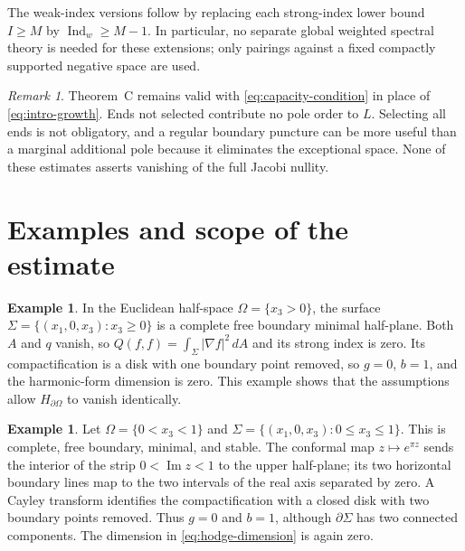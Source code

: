 \documentclass[11pt]{amsart}
\numberwithin{equation}{section}
\theoremstyle{definition}
\newtheorem{example}[theorem]{Example}
\theoremstyle{remark}
\newtheorem{remark}[theorem]{Remark}
\newcommand{\dd}{\,d}
\DeclareMathOperator{\Ind}{Ind}
\begin{document}
The weak-index versions follow by replacing each strong-index lower bound $I\ge M$ by $\Ind_w\ge M-1$. In particular, no separate global weighted spectral theory is needed for these extensions; only pairings against a fixed compactly supported negative space are used.

\begin{remark}
Theorem~C remains valid with \eqref{eq:capacity-condition} in place of \eqref{eq:intro-growth}. Ends not selected contribute no pole order to $L$. Selecting all ends is not obligatory, and a regular boundary puncture can be more useful than a marginal additional pole because it eliminates the exceptional space. None of these estimates asserts vanishing of the full Jacobi nullity.
\end{remark}

\section{Examples and scope of the estimate}\label{sec:scope}
\begin{example}
In the Euclidean half-space $\Omega=\{x_3>0\}$, the surface
$\Sigma=\{(x_1,0,x_3):x_3\ge0\}$ is a complete free boundary minimal half-plane. Both $A$ and $q$ vanish, so $Q(f,f)=\int_\Sigma|\nabla f|^2\dd A$ and its strong index is zero. Its compactification is a disk with one boundary point removed, so $g=0$, $b=1$, and the harmonic-form dimension is zero. This example shows that the assumptions allow $H_{\partial\Omega}$ to vanish identically.
\end{example}

\begin{example}
Let $\Omega=\{0<x_3<1\}$ and
$\Sigma=\{(x_1,0,x_3):0\le x_3\le1\}$. This is complete, free boundary, minimal, and stable. The conformal map $z\mapsto e^{\pi z}$ sends the interior of the strip $0<\operatorname{Im}z<1$ to the upper half-plane; its two horizontal boundary lines map to the two intervals of the real axis separated by zero. A Cayley transform identifies the compactification with a closed disk with two boundary points removed. Thus $g=0$ and $b=1$, although $\partial\Sigma$ has two connected components. The dimension in \eqref{eq:hodge-dimension} is again zero.
\end{example}
\end{document}
